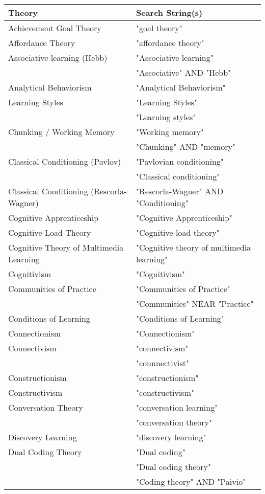 \begin{table*}[t]
\begin{tabular}{ll}
Theory & Search String(s)\\\hline
Achievement Goal Theory & "goal theory"\\
Affordance Theory & "affordance theory"\\
Associative learning (Hebb) & "Associative learning"\\
 & "Associative" AND "Hebb"\\
Analytical Behaviorism & "Analytical Behaviorism"\\
Learning Styles & "Learning Styles"\\
 & "Learning styles"\\
Chunking / Working Memory & "Working memory"\\
 & "Chunking" AND "memory"\\
Classical Conditioning (Pavlov) & "Pavlovian conditioning"\\
 & "Classical conditioning"\\
Classical Conditioning (Rescorla-Wagner) & "Rescorla-Wagner" AND "Conditioning"\\
Cognitive Apprenticeship & "Cognitive Apprenticeship"\\
Cognitive Load Theory & "Cognitive load theory"\\
Cognitive Theory of Multimedia Learning & "Cognitive theory of multimedia learning"\\
Cognitivism & "Cognitivism"\\
Communities of Practice & "Communities of Practice"\\
 & "Communities" NEAR "Practice"\\
Conditions of Learning & "Conditions of Learning"\\
Connectionism & "Connectionism"\\
Connectivism & "connectivism"\\
 & "connnectivist"\\
Constructionism & "constructionism"\\
Constructivism & "constructivism"\\
Conversation Theory & "conversation learning"\\
 & "conversation theory"\\
Discovery Learning & "discovery learning"\\
Dual Coding Theory & "Dual coding"\\
 & "Dual coding theory"\\
 & "Coding theory" AND "Paivio"\\

\end{tabular}
\end{table*}
